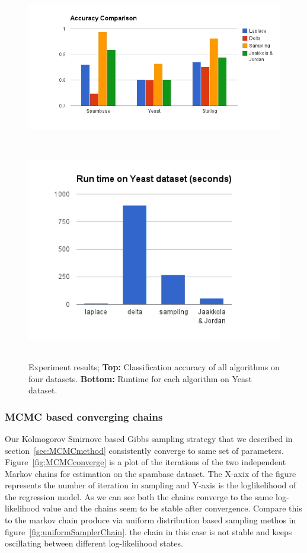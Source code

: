 \begin{figure}[t]
\centering
\includegraphics[height=7.0cm]{results/accuracy_comp.png}
\includegraphics[height=9.0cm]{results/speed_comp.png}

\caption{\small Experiment results; {\bf Top:} Classification accuracy of all algorithms on
four datasets. {\bf Bottom:} Runtime for each algorithm on Yeast dataset. }
\label{fig:results}
\end{figure}

\subsubsection{MCMC based converging chains}

Our Kolmogorov Smirnove based Gibbs sampling strategy that we described in
section~\ref{sec:MCMCmethod} consistently converge to same set of parameters.
Figure~\ref{fig:MCMCconverge} is a plot of the iterations of the two
independent Markov chains for estimation on the spambase dataset.  The X-axix
of the figure represents the number of iteration in sampling and Y-axis is the
loglikelihood of the regression model.  As we can see both the chains converge
to the same log-likelihood value and the chains seem to be stable after
convergence. Compare this to the markov chain produce via uniform distribution
based sampling methos in figure~\ref{fig:uniformSamplerChain}. the chain in
this case is not stable and keeps oscillating between different log-likelihood
states. 
 

